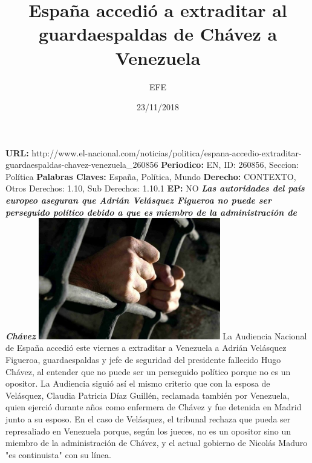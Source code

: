 \documentclass{article}%
\title{\textbf{España accedió a extraditar al guardaespaldas de Chávez a Venezuela}}%
\author{EFE}%
\date{23/11/2018}%
\begin{document}
%
\normalsize%
\maketitle%
\textbf{URL: }%
http://www.el{-}nacional.com/noticias/politica/espana{-}accedio{-}extraditar{-}guardaespaldas{-}chavez{-}venezuela\_260856\newline%
%
\textbf{Periodico: }%
EN, %
ID: %
260856, %
Seccion: %
Política\newline%
%
\textbf{Palabras Claves: }%
España, Política, Mundo\newline%
%
\textbf{Derecho: }%
CONTEXTO, %
Otros Derechos: %
1.10, %
Sub Derechos: %
1.10.1\newline%
%
\textbf{EP: }%
NO\newline%
\newline%
%
\textbf{\textit{Las autoridades del país europeo aseguran que Adrián Velásquez Figueroa no puede ser perseguido político debido a que es miembro de la administración de Chávez}}%
\newline%
\newline%
%
\includegraphics[width=300px]{63.jpg}%
\newline%
%
La Audiencia Nacional de España accedió este viernes a extraditar a Venezuela a Adrián Velásquez Figueroa, guardaespaldas y jefe de seguridad del presidente fallecido Hugo Chávez, al entender que no puede ser un perseguido político porque no es un opositor.%
\newline%
%
La Audiencia siguió así el mismo criterio que con la esposa de Velásquez, Claudia Patricia Díaz Guillén, reclamada también por Venezuela, quien ejerció durante años como enfermera de Chávez y fue detenida en Madrid junto a su esposo.%
\newline%
%
En el caso de Velásquez, el tribunal rechaza que pueda ser represaliado en Venezuela porque, según los jueces, no es un opositor sino un miembro de la administración de Chávez, y el actual gobierno de Nicolás Maduro "es continuista" con su línea.%
\newline%
\end{document}
